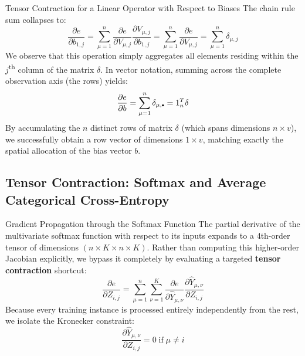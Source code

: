 \begin{frame}{Tensor Contraction for a Linear Operator with Respect to Biases}
	The chain rule sum collapses to:
	\begin{equation*}
		\frac{\partial{e}}{\partial{b_{1,j}}} = \sum_{\mu=1}^n \frac{\partial{e}}{\partial{V_{\mu,j}}} \frac{\partial{V_{\mu,j}}}{\partial{b_{1,j}}} = \sum_{\mu=1}^n \frac{\partial{e}}{\partial{V_{\mu,j}}} = \sum_{\mu=1}^n \delta_{\mu,j}
	\end{equation*}
	\pause
	We observe that this operation simply aggregates all elements residing within the $j$\textsuperscript{th} column of the matrix $\delta$. In vector notation, summing across the complete observation axis (the rows) yields:
	\begin{equation*}
		\frac{\partial{e}}{\partial{b}} = \sum_{\mu=1}^n \delta_{\mu, \bigdot} = 1_n^T \delta
	\end{equation*}
	By accumulating the $n$ distinct rows of matrix $\delta$ (which spans dimensions $n \times v$), we successfully obtain a row vector of dimensions $1 \times v$, matching exactly the spatial allocation of the bias vector $b$. 
\end{frame}

\subsection{Tensor Contraction: Softmax and Average Categorical Cross-Entropy}

\begin{frame}{Gradient Propagation through the Softmax Function}
	The partial derivative of the multivariate softmax function with respect to its inputs expands to a 4th-order tensor of dimensions $(n\times K \times n \times K)$. Rather than computing this higher-order Jacobian explicitly, we bypass it completely by evaluating a targeted \textbf{tensor contraction} shortcut:
	\begin{equation*}
		\frac{\partial{e}}{\partial{Z_{i,j}}} = \sum_{\mu=1}^n \sum_{\nu=1}^K \frac{\partial{e}}{\partial{\hat{Y}_{\mu,\nu}}} \frac{\partial{\hat{Y}_{\mu,\nu}}}{\partial{Z_{i,j}}}
	\end{equation*}
	\pause
	Because every training instance is processed entirely independently from the rest, we isolate the Kronecker constraint:
	\begin{equation*}
		\frac{\partial{\hat{Y}_{\mu,\nu}}}{\partial{Z_{i,j}}} = 0 \; \text{if} \; \mu \ne i
	\end{equation*}
\end{frame}

